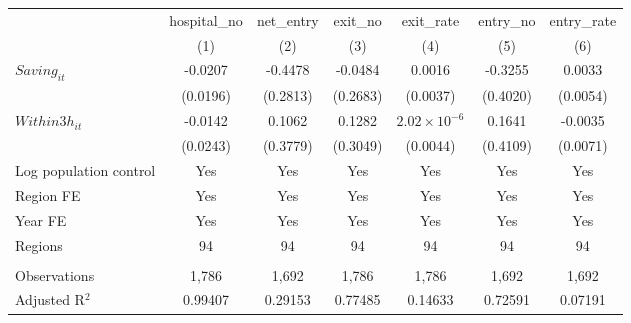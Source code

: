 \begingroup
\centering
\begin{tabular}{lcccccc}
   \toprule
                          & hospital\_no  & net\_entry  & exit\_no  & exit\_rate            & entry\_no  & entry\_rate \\    
                          & (1)           & (2)         & (3)       & (4)                   & (5)        & (6)\\  
   \midrule 
   $Saving_{it}$          & -0.0207       & -0.4478     & -0.0484   & 0.0016                & -0.3255    & 0.0033\\   
                          & (0.0196)      & (0.2813)    & (0.2683)  & (0.0037)              & (0.4020)   & (0.0054)\\   
   $Within3h_{it}$        & -0.0142       & 0.1062      & 0.1282    & $2.02\times 10^{-6}$  & 0.1641     & -0.0035\\   
                          & (0.0243)      & (0.3779)    & (0.3049)  & (0.0044)              & (0.4109)   & (0.0071)\\   
   Log population control & Yes           & Yes         & Yes       & Yes                   & Yes        & Yes\\  
   Region FE              & Yes           & Yes         & Yes       & Yes                   & Yes        & Yes\\  
   Year FE                & Yes           & Yes         & Yes       & Yes                   & Yes        & Yes\\  
   Regions                & 94            & 94          & 94        & 94                    & 94         & 94\\  
    \\
   Observations           & 1,786         & 1,692       & 1,786     & 1,786                 & 1,692      & 1,692\\  
   Adjusted R$^2$         & 0.99407       & 0.29153     & 0.77485   & 0.14633               & 0.72591    & 0.07191\\  
   \bottomrule
\end{tabular}
\par\endgroup
